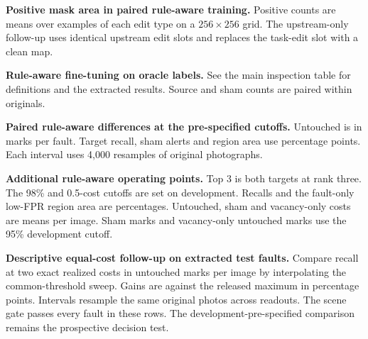 \begin{table}[t]
\centering
\caption{\textbf{Positive mask area in paired rule-aware training.} Positive counts are means over examples of each edit type on a $256{\times}256$ grid. The upstream-only follow-up uses identical upstream edit slots and replaces the task-edit slot with a clean map.}
\label{tab:area_v3}
\small

\end{table}

\begin{table}[t]
\centering
\caption{\textbf{Rule-aware fine-tuning on oracle labels.} See the main inspection table for definitions and the extracted results. Source and sham counts are paired within originals.}
\label{tab:oracle_v3}
\small
\setlength{\tabcolsep}{4.5pt}

\end{table}

\begin{table}[t]
\centering
\caption{\textbf{Paired rule-aware differences at the pre-specified cutoffs.} Untouched is in marks per fault. Target recall, sham alerts and region area use percentage points. Each interval uses 4,000 resamples of original photographs.}
\label{tab:contrasts_v3}
\small

\end{table}

\begin{table}[t]
\centering
\caption{\textbf{Additional rule-aware operating points.} Top 3 is both targets at rank three. The 98\% and 0.5-cost cutoffs are set on development. Recalls and the fault-only low-FPR region area are percentages. Untouched, sham and vacancy-only costs are means per image. Sham marks and vacancy-only untouched marks use the 95\% development cutoff.}
\label{tab:operating_v3}
\scriptsize
\setlength{\tabcolsep}{3pt}

\end{table}

\begin{table}[t]
\centering
\caption{\textbf{Descriptive equal-cost follow-up on extracted test faults.} Compare recall at two exact realized costs in untouched marks per image by interpolating the common-threshold sweep. Gains are against the released maximum in percentage points. Intervals resample the same original photos across readouts. The scene gate passes every fault in these rows. The development-pre-specified comparison remains the prospective decision test.}
\label{tab:exactcost}
\scriptsize
\setlength{\tabcolsep}{4pt}

\end{table}

